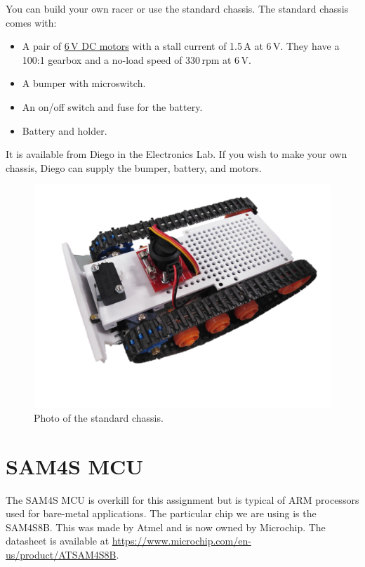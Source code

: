 You can build your own racer or use the standard chassis.  The
standard chassis comes with:
%
\begin{itemize}
\item A pair of \href{https://www.pololu.com/product/3065}{6\,V DC
  motors} with a stall current of 1.5\,A at 6\,V.  They have a 100:1
  gearbox and a no-load speed of 330\,rpm at 6\,V.

\item A bumper with microswitch.

\item An on/off switch and fuse for the battery.

\item Battery and holder.
\end{itemize}
%
It is available from Diego in the Electronics Lab.  If you wish to
make your own chassis, Diego can supply the bumper, battery, and
motors.


\begin{figure}[!h]
  \centering \includegraphics[width=5in]{figs/chassis.jpg}
  \caption{Photo of the standard chassis.}
  \label{fig:chassis}
\end{figure}



\section{SAM4S MCU}\label{sam4s-mcu}

The SAM4S MCU is overkill for this assignment but is typical of ARM
processors used for bare-metal applications.  The particular chip we
are using is the SAM4S8B.  This was made by Atmel and is now owned by
Microchip.  The datasheet is available
at \url{https://www.microchip.com/en-us/product/ATSAM4S8B}.

